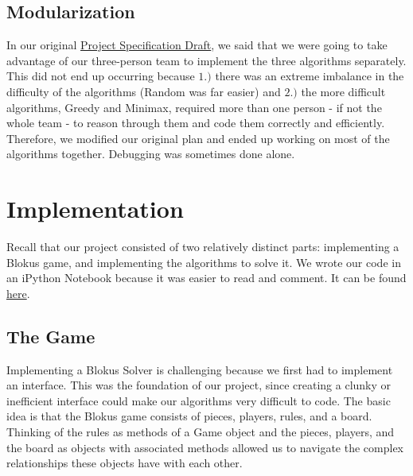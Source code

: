 \documentclass[11pt]{article}
\begin{document}
\subsection{Modularization}

In our original \href{run:report/Final Project Specification (Draft) Ann..pdf}{Project Specification Draft}, we said that we were going to take advantage of our three-person team to implement the three algorithms separately. This did not end up occurring because $1.)$ there was an extreme imbalance in the difficulty of the algorithms (Random was far easier) and $2.)$ the more difficult algorithms, Greedy and Minimax, required more than one person - if not the whole team - to reason through them and code them correctly and efficiently. Therefore, we modified our original plan and ended up working on most of the algorithms together. Debugging was sometimes done alone.


\pagebreak


\section{Implementation}

Recall that our project consisted of two relatively distinct parts: implementing a Blokus game, and implementing the algorithms to solve it. We wrote our code in an iPython Notebook because it was easier to read and comment. It can be found \href{http://nbviewer.ipython.org/github/yuanjiang/blokus_solver/blob/master/Final\%20Project/code/Blokus\%20Solver.ipynb}{here}.

\subsection{The Game}

Implementing a Blokus Solver is challenging because we first had to implement an interface. This was the foundation of our project, since creating a clunky or inefficient interface could make our algorithms very difficult to code. The basic idea is that the Blokus game consists of pieces, players, rules, and a board. Thinking of the rules as methods of a Game object and the pieces, players, and the board as objects with associated methods allowed us to navigate the complex relationships these objects have with each other.

\bigskip
\end{document}
